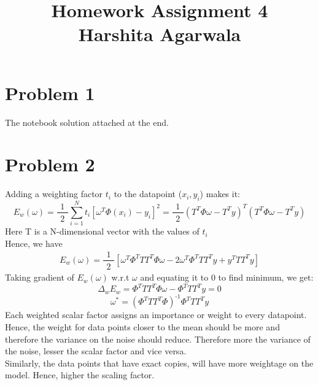\documentclass[11pt, a4paper, fleqn]{article}
\begin{document}
\title{Homework Assignment 4\\
Harshita Agarwala}
\maketitle
\section{Problem 1}
The notebook solution attached at the end.

\section{Problem 2}
Adding a weighting factor $t_i$ to the datapoint ($x_i,y_i$) makes it:
\begin{equation*}
E_w(\omega) = \frac{\substack{1}}{\substack{2}} \sum_{i=1}^{N}{t_i [\omega^T \Phi(x_i) - y_i]^2}
=  \frac{\substack{1}}{\substack{2}} (T^T\Phi \omega - T^T y)^T (T^T\Phi \omega - T^T y)
\end{equation*}
Here T is a N-dimensional vector with the values of $t_i$ \\
Hence, we have
\begin{equation*}
 E_w(\omega) = \frac{\substack{1}}{\substack{2}} [\omega^T \Phi^T T T^T \Phi \omega - 2\omega^T \Phi^T T T^T y + y^T T T^T y ]
\end{equation*}
Taking gradient of $E_w(\omega)$ w.r.t $\omega$ and equating it to 0 to find minimum, we get:
\begin{equation*}
\Delta_w E_w = \Phi^T T T^T \Phi \omega - \Phi^T T T^T y = 0
\end{equation*}
\begin{equation*}
\omega^* = (\Phi^T T T^T \Phi)^\text{-1} \Phi^T T T^T y
\end{equation*}
Each weighted scalar factor assigns an importance or weight to every datapoint. Hence, the weight for data points closer to the mean should be more and therefore the variance on the noise should reduce. Therefore more the variance of the noise, lesser the scalar factor and vice versa.\\
Similarly, the data points that have exact copies, will have more weightage on the model. Hence, higher the scaling factor.
\end{document}
